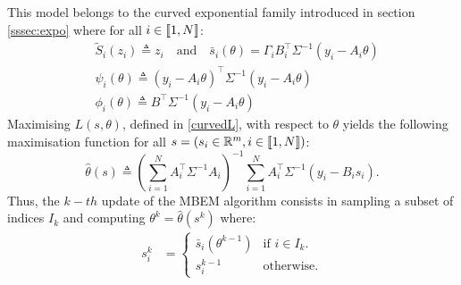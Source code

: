 This model belongs to the curved exponential family introduced in section \ref{sssec:expo} where for all $i \in \llbracket1,N\rrbracket$:
\begin{align}\label{statmem}
& \tilde{S}_i(z_i) \triangleq z_i \quad \textrm{and} \quad \bar{s}_i(\theta) =  \Gamma_i B_i^\top\Sigma^{-1} (y_i - A_i\theta)\\
& \psi_i(\theta) \triangleq  (y_i - A_i\theta)^\top\Sigma^{-1}(y_i - A_i\theta)\\
& \phi_i(\theta) \triangleq B^\top \Sigma^{-1} (y_i - A_i\theta)
\end{align}
Maximising $L(s,\theta)$, defined in \eqref{curvedL}, with respect to $\theta$ yields the following maximisation function for all $s=(s_i \in \mathbb{R}^{m}, i \in \llbracket1,N\rrbracket)$:
\begin{equation*}
\hat{\theta}(s) \triangleq \left(\sum_{i=1}^{N}{A_i^\top \Sigma^{-1}A_i}\right)^{-1}\sum_{i=1}^{N}{A_i^\top \Sigma^{-1}(y_i - B_i s_i)}.
\end{equation*}
Thus, the $k-th$ update of the MBEM algorithm consists in sampling a subset of indices $I_k$ and computing $\theta^k = \hat{\theta}(s^k)$ where:
\begin{align*}
  s_i^k &=
  \begin{cases}
   \bar{s}_i(\theta^{k-1})        & \text{if } i \in I_k. \\
   s_i^{k-1}         & \text{otherwise}.
  \end{cases}
\end{align*}

